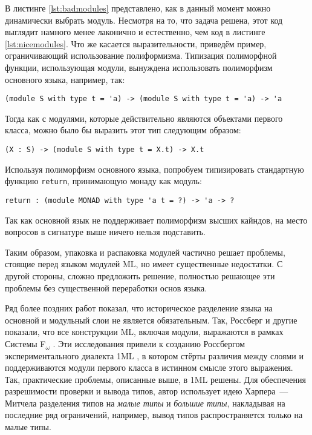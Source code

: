 \documentclass[../diploma.tex]{subfiles}
\begin{document}
В листинге \ref{lst:badmodules} представлено, как в данный момент можно динамически выбрать модуль. Несмотря на то, что задача решена, этот код выглядит намного менее лаконично и естественно, чем код в листинге \ref{lst:nicemodules}. Что же касается выразительности, приведём пример, ограничивающий использование полиформизма. Типизация полиморфной функции, использующая модули, вынуждена использовать полиморфизм основного языка, например, так:

\begin{verbatim}
(module S with type t = 'a) -> (module S with type t = 'a) -> 'a
\end{verbatim}

Тогда как с модулями, которые действительно являются объектами первого класса, можно было бы выразить этот тип следующим образом:
\begin{verbatim}
(X : S) -> (module S with type t = X.t) -> X.t
\end{verbatim}

Используя полиморфизм основного языка, попробуем типизировать стандартную функцию \texttt{return}, принимающую монаду как модуль:
\begin{verbatim}
return : (module MONAD with type 'a t = ?) -> 'a -> ?
\end{verbatim}

Так как основной язык не поддерживает полиморфизм высших кайндов, на место вопросов в сигнатуре выше ничего нельзя подставить. 

Таким образом, упаковка и распаковка модулей частично решает проблемы, стоящие перед языком модулей ML, но имеет существенные недостатки. С другой стороны, сложно предложить решение, полностью решающее эти проблемы без существенной переработки основ языка.

Ряд более поздних работ показал, что историческое разделение языка на основной и модульный слои не является обязательным. Так, Россберг и другие показали, что все конструкции ML, включая модули, выражаются в рамках Системы F\textsubscript{$\omega$} \cite{fing}. Эти исследования привели к созданию Россбергом экспериментального диалекта 1ML \cite{1ml}, в котором стёрты различия между слоями и поддерживаются модули первого класса в истинном смысле этого выражения. Так, практические проблемы, описанные выше, в 1ML решены. Для обеспечения разрешимости проверки и вывода типов, автор использует идею Харпера~--- Митчела \cite{harper_mitchell} разделения типов на \textit{малые типы} и \textit{большие типы}, накладывая на последние ряд ограничений, например, вывод типов распространяется только на малые типы.  
\end{document}

